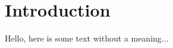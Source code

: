 \documentclass[../main.tex]{subfiles}
\begin{document}
\chapter{Introduction}

Hello, here is some text without a meaning...
\end{document}
